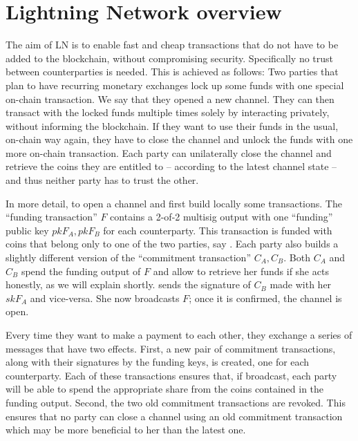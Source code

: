 \section{Lightning Network overview}
\label{sec:ov-ln}

    The aim of LN is to enable fast and cheap transactions that do not have to
    be added to the blockchain, without compromising security. Specifically no
    trust between counterparties is needed. This is achieved as follows: Two
    parties that plan to have recurring monetary exchanges lock up some funds
    with one special on-chain transaction. We say that they opened a new
    channel. They can then transact with the locked funds multiple times solely
    by interacting privately, without informing the blockchain. If they want to
    use their funds in the usual, on-chain way again, they have to close the
    channel and unlock the funds with one more on-chain transaction. Each party
    can unilaterally close the channel and retrieve the coins they are entitled
    to -- according to the latest channel state -- and thus neither party has to
    trust the other.

    In more detail, to open a channel \alice{} and \bob{} first build locally
    some transactions. The ``funding transaction'' $F$ contains a 2-of-2
    multisig output with one ``funding'' public key $pkF_A, pkF_B$ for each
    counterparty. This transaction is funded with coins that belong only to one
    of the two parties, say \alice. Each party also builds a slightly different
    version of the ``commitment transaction'' $C_A, C_B$. Both $C_A$ and $C_B$
    spend the funding output of $F$ and allow \alice{} to retrieve her funds if
    she acts honestly, as we will explain shortly. \alice{} sends \bob{} the
    signature of $C_B$ made with her $skF_A$ and vice-versa. She now broadcasts
    $F$; once it is confirmed, the channel is open.

    Every time they want to make a payment to each other, they exchange a series
    of messages that have two effects. First, a new pair of commitment
    transactions, along with their signatures by the funding keys, is created,
    one for each counterparty. Each of these transactions ensures that, if
    broadcast, each party will be able to spend the appropriate share from the
    coins contained in the funding output. Second, the two old commitment
    transactions are revoked. This ensures that no party can close a channel
    using an old commitment transaction which may be more beneficial to her than
    the latest one.

